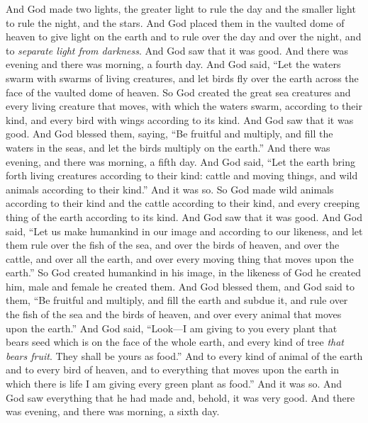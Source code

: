 \begin{biblechapter}
\verse And God made two lights, the greater light to rule the day and the smaller light to rule the night, and the stars.
\verse And God placed them in the vaulted dome of heaven to give light on the earth
\verse and to rule over the day and over the night, and to \textit{separate light from darkness}. And God saw that it was good.
\verse And there was evening and there was morning, a fourth day.
\verse And God said, “Let the waters swarm with swarms of living creatures, and let birds fly over the earth across the face of the vaulted dome of heaven.
\verse So God created the great sea creatures and every living creature that moves, with which the waters swarm, according to their kind, and every bird with wings according to its kind. And God saw that it was good.
\verse And God blessed them, saying, “Be fruitful and multiply, and fill the waters in the seas, and let the birds multiply on the earth.”
\verse And there was evening, and there was morning, a fifth day.
\verse And God said, “Let the earth bring forth living creatures according to their kind: cattle and moving things, and wild animals according to their kind.” And it was so.
\verse So God made wild animals according to their kind and the cattle according to their kind, and every creeping thing of the earth according to its kind. And God saw that it was good.
\verse And God said, “Let us make humankind in our image and according to our likeness, and let them rule over the fish of the sea, and over the birds of heaven, and over the cattle, and over all the earth, and over every moving thing that moves upon the earth.”
\verse So God created humankind in his image, in the likeness of God he created him, male and female he created them.
\verse And God blessed them, and God said to them, “Be fruitful and multiply, and fill the earth and subdue it, and rule over the fish of the sea and the birds of heaven, and over every animal that moves upon the earth.”
\verse And God said, “Look—I am giving to you every plant that bears seed which is on the face of the whole earth, and every kind of tree \textit{that bears fruit}. They shall be yours as food.”
\verse And to every kind of animal of the earth and to every bird of heaven, and to everything that moves upon the earth in which there is life I am giving every green plant as food.” And it was so.
\verse And God saw everything that he had made and, behold, it was very good. And there was evening, and there was morning, a sixth day.
\end{biblechapter}

